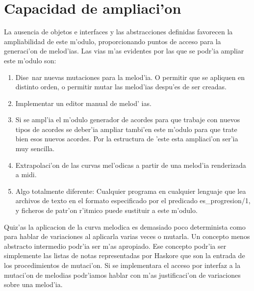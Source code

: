 ﻿\documentclass[a4paper,12pt]{article}
\begin{document}
\section {Capacidad de ampliaci'on}
La ausencia de objetos e interfaces y las abstracciones definidas favorecen la ampliabilidad de este m'odulo, proporcionando puntos de acceso para la generaci'on de melod'ias. Las vias m'as evidentes por las que se podr'ia ampliar este m'odulo son:
	\begin{enumerate}
	\item Dise~nar nuevas mutaciones para la melod'ia. O permitir que se apliquen en distinto orden, o permitir mutar las melod'ias despu'es de ser creadas.
	\item Implementar un editor manual de melod' ias.
	\item Si se ampl'ia el m'odulo generador de acordes para que trabaje con nuevos tipos de acordes se deber'ia ampliar tambi'en este m'odulo para que trate bien esos nuevos acordes. Por la estructura de 'este esta ampliaci'on ser'ia muy sencilla.
	\item Extrapolaci'on de las curvas mel'odicas a partir de una melod'ia renderizada a midi.
	\item Algo totalmente diferente: Cualquier programa en cualquier lenguaje que lea archivos de texto en el formato especificado por el predicado es\_progresion/1, y ficheros de patr'on r'itmico puede sustituir a este m'odulo.
	\end{enumerate}


Quiz'as la aplicacion de la curva melodica es demasiado poco determinista como para hablar de variaciones al aplicarla varias veces o mutarla. Un concepto menos abstracto intermedio podr'ia ser m'as apropiado. Ese concepto podr'ia ser simplemente las listas de notas representadas por Haskore que son la entrada de los procedimientos de mutaci'on. Si se implementara el acceso por interfaz a la mutaci'on de melodias podr'iamos hablar con m'as justificaci'on de variaciones sobre una melod'ia.
\end{document}
